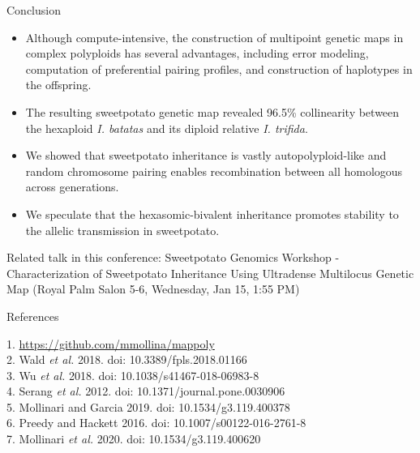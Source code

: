 \documentclass[final, 13pt]{beamer}
\newlength{\twocolwid}
\begin{document}
\begin{frame}[t]
\begin{columns}[t]
\begin{column}{\twocolwid}
\begin{block}{Conclusion}
\begin{itemize}
\item Although compute-intensive, the construction of multipoint genetic maps in complex polyploids has several advantages, including error modeling, computation of preferential pairing profiles, and construction of haplotypes in the offspring.
\item The resulting sweetpotato genetic map revealed 96.5\% collinearity between the hexaploid  \textit{I. batatas} and its diploid relative \textit{I. trifida}. 
\item We showed that sweetpotato inheritance is vastly autopolyploid-like and random chromosome pairing enables recombination between all homologous across generations.
\item We speculate that the hexasomic-bivalent inheritance promotes stability to the allelic transmission in sweetpotato.
\end{itemize}
 Related talk in this conference: Sweetpotato Genomics Workshop - Characterization of Sweetpotato Inheritance Using Ultradense Multilocus Genetic Map (Royal Palm Salon 5-6, Wednesday, Jan 15, 1:55 PM)
\end{block}


\begin{block}{References}
\begin{small}
1. \url{https://github.com/mmollina/mappoly} \\
2. Wald \textit{et al.} 2018. doi: 10.3389/fpls.2018.01166 \\
3. Wu \textit{et al.} 2018. doi: 10.1038/s41467-018-06983-8\\
4. Serang \textit{et al.} 2012. doi: 10.1371/journal.pone.0030906\\
5. Mollinari and Garcia 2019. doi: 10.1534/g3.119.400378 \\
6. Preedy and Hackett 2016. doi: 10.1007/s00122-016-2761-8\\
7. Mollinari \textit{et al.} 2020. doi: 10.1534/g3.119.400620\\
\end{small}

\end{block}




\end{column}
\end{columns}
\end{frame}
\end{document}
